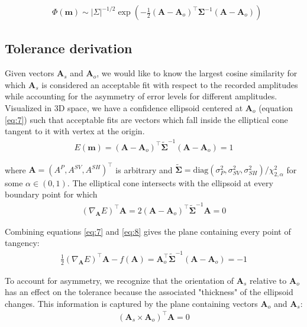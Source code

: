 \documentclass[preprint]{seismica}
\begin{document}
    \begin{align} \label{eq:6}
      &\Phi(\bm{m}) \sim |\Sigma|^{-1/2} \exp \left( - \frac{1}{2} (\bm{A} - \bm{A}_o)^\top \bm{\Sigma}^{-1} (\bm{A} - \bm{A}_o) \right)
    \end{align}

  \subsection{Tolerance derivation}
    Given vectors $\bm{A}_s$ and $\bm{A}_o$, we would like to know the largest cosine
    similarity for which $\bm{A}_s$ is considered an acceptable fit with respect to the recorded amplitudes
    while accounting for the asymmetry of error levels for different amplitudes. Visualized in 3D
    space, we have a confidence ellipsoid centered at $\bm{A}_o$ (equation \ref{eq:7}) such that
    acceptable fits are vectors which fall inside the elliptical cone tangent to it with vertex at the
    origin.
    \begin{align} \label{eq:7}
      E(\bm{m}) = (\bm{A} - \bm{A}_o)^\top \tilde{\bm{\Sigma}}^{-1} (\bm{A} - \bm{A}_o)  = 1
    \end{align}
    
    \noindent where $\bm{A} = (A^P, A^{SV}, A^{SH})^\top$ is arbitrary
    and $\tilde{\bm{\Sigma}} = \text{diag}(\sigma_P^2, \sigma_{SV}^2, \sigma_{SH}^2)/\chi^2_{2,\alpha}$ for some $\alpha \in (0,1)$. The elliptical
    cone intersects with the ellipsoid at every boundary point for which
    \begin{align} \label{eq:8}
      (\nabla_{\bm{A}} E)^\top \bm{A} = 2(\bm{A} - \bm{A}_o)^\top \tilde{\bm{\Sigma}}^{-1} \bm{A} = 0
    \end{align}
    
    Combining equations \ref{eq:7} and \ref{eq:8} gives the plane containing every point of 
    tangency:
    \begin{align} \label{eq:9}
      \frac{1}{2} (\nabla_{\bm{A}} E)^\top \bm{A} - f(\bm{A}) = 
              \bm{A}_o^\top \tilde{\bm{\Sigma}}^{-1} (\bm{A} - \bm{A}_o)  = -1
    \end{align}

    To account for asymmetry, we recognize that the orientation of $\bm{A}_s$ relative to $\bm{A}_o$
    has an effect on the tolerance because the associated "thickness" of the ellipsoid changes.
    This information is captured by the plane containing vectors $\bm{A}_o$ and $\bm{A}_s$:
    \begin{align} \label{eq:10}
      (\bm{A}_s \times \bm{A}_o)^\top \bm{A} = 0
    \end{align}
\end{document}
